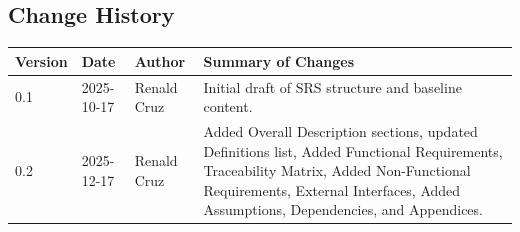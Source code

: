 \documentclass[12pt,a4paper]{article}
\begin{document}
\subsection{Change History}
\begin{center}
\begin{tabular}{p{} p{} p{} p{}}
\textbf{Version} & \textbf{Date} & \textbf{Author} & \textbf{Summary of Changes} \\ \hline
0.1 & 2025-10-17 & Renald Cruz & Initial draft of SRS structure and baseline content. \\
0.2 & 2025-12-17 & Renald Cruz & Added Overall Description sections, updated Definitions list, Added Functional Requirements, Traceability Matrix, Added Non-Functional Requirements, External Interfaces, Added Assumptions, Dependencies, and Appendices.\\
\end{tabular}
\end{center}
\end{document}
